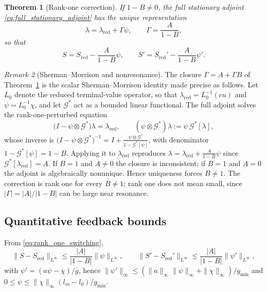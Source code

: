 \documentclass[pdflatex,sn-mathphys-num]{sn-jnl}
\theoremstyle{plain}
\newtheorem{theorem}{Theorem}[section]
\theoremstyle{definition}
\theoremstyle{remark}
\newtheorem{remark}[theorem]{Remark}
\begin{document}
\begin{theorem}[Rank-one correction]
\label{thm:rank_one_correction}
If $1-B\neq0$, the full stationary adjoint
\eqref{eq:full_stationary_adjoint} has the unique representation
\[
\lambda=\lambda_{\mathrm{red}}+\Gamma\psi,
\qquad
\Gamma=\frac{A}{1-B},
\]
so that
\begin{equation}\label{eq:rank_one_switching}
S=S_{\mathrm{red}}-\frac{A}{1-B}\psi,
\qquad
S'=S_{\mathrm{red}}'-\frac{A}{1-B}\psi'.
\end{equation}
\end{theorem}

\begin{remark}[Sherman--Morrison and nonresonance]
\label{rmk:nonresonance}
The closure $\Gamma=A+\Gamma B$ of Theorem~\ref{thm:rank_one_correction} is the
scalar Sherman--Morrison identity \cite{sherman1950adjustment} made precise as follows. Let $L_0$ denote the
reduced terminal-value operator, so that $\lambda_{\mathrm{red}}=L_0^{-1}(cu)$ and
$\psi=L_0^{-1}\chi$, and let $\mathcal G^*$ act as a bounded linear functional.
The full adjoint solves the rank-one-perturbed equation
\[
\big(I-\psi\otimes\mathcal G^*\big)\lambda=\lambda_{\mathrm{red}},
\qquad
(\psi\otimes\mathcal G^*)\lambda:=\psi\,\mathcal G^*[\lambda],
\]
whose inverse is $\big(I-\psi\otimes\mathcal G^*\big)^{-1}
=I+\frac{\psi\otimes\mathcal G^*}{1-\mathcal G^*[\psi]}$, with denominator
$1-\mathcal G^*[\psi]=1-B$. Applying it to $\lambda_{\mathrm{red}}$ reproduces
$\lambda=\lambda_{\mathrm{red}}+\frac{A}{1-B}\psi$ since
$\mathcal G^*[\lambda_{\mathrm{red}}]=A$. If $B=1$ and $A\neq0$ the closure is
inconsistent; if $B=1$ and $A=0$ the adjoint is algebraically nonunique. Hence
uniqueness forces $B\neq1$. The correction is rank one for every $B\neq1$; rank
one does not mean small, since $|\Gamma|=|A|/|1-B|$ can be large near resonance.
\end{remark}

\subsection{Quantitative feedback bounds}
\label{subsec:feedback_bounds}

From \eqref{eq:rank_one_switching},
\[
\|S-S_{\mathrm{red}}\|_{L^\infty}\le\frac{|A|}{|1-B|}\|\psi\|_{L^\infty},
\qquad
\|S'-S_{\mathrm{red}}'\|_{L^\infty}\le\frac{|A|}{|1-B|}\|\psi'\|_{L^\infty},
\]
with $\psi'=(a\psi-\chi)/\bar g$, hence
$\|\psi'\|_\infty\le(\|a\|_\infty\|\psi\|_\infty+\|\chi\|_\infty)/g_{\min}$ and
$0\le\psi\le\|\chi\|_\infty(l_m-l_0)/g_{\min}$.
\end{document}
